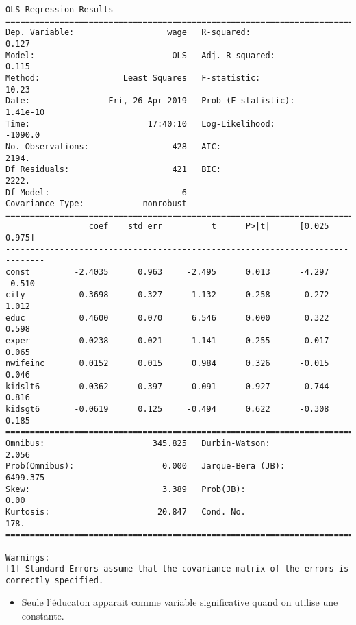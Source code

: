 \documentclass[11pt]{article}
\providecommand{\tightlist}{%
      \setlength{\itemsep}{0pt}\setlength{\parskip}{0pt}}
\begin{document}
    \begin{Verbatim}[commandchars=\\\{\}]
                            OLS Regression Results                            
==============================================================================
Dep. Variable:                   wage   R-squared:                       0.127
Model:                            OLS   Adj. R-squared:                  0.115
Method:                 Least Squares   F-statistic:                     10.23
Date:                Fri, 26 Apr 2019   Prob (F-statistic):           1.41e-10
Time:                        17:40:10   Log-Likelihood:                -1090.0
No. Observations:                 428   AIC:                             2194.
Df Residuals:                     421   BIC:                             2222.
Df Model:                           6                                         
Covariance Type:            nonrobust                                         
==============================================================================
                 coef    std err          t      P>|t|      [0.025      0.975]
------------------------------------------------------------------------------
const         -2.4035      0.963     -2.495      0.013      -4.297      -0.510
city           0.3698      0.327      1.132      0.258      -0.272       1.012
educ           0.4600      0.070      6.546      0.000       0.322       0.598
exper          0.0238      0.021      1.141      0.255      -0.017       0.065
nwifeinc       0.0152      0.015      0.984      0.326      -0.015       0.046
kidslt6        0.0362      0.397      0.091      0.927      -0.744       0.816
kidsgt6       -0.0619      0.125     -0.494      0.622      -0.308       0.185
==============================================================================
Omnibus:                      345.825   Durbin-Watson:                   2.056
Prob(Omnibus):                  0.000   Jarque-Bera (JB):             6499.375
Skew:                           3.389   Prob(JB):                         0.00
Kurtosis:                      20.847   Cond. No.                         178.
==============================================================================

Warnings:
[1] Standard Errors assume that the covariance matrix of the errors is correctly specified.

    \end{Verbatim}

    \begin{itemize}
\tightlist
\item
  Seule l'éducaton apparait comme variable significative quand on
  utilise une constante.
\end{itemize}
\end{document}
